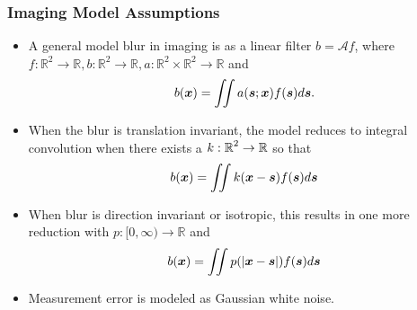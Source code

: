 \documentclass[]{beamer}
\newcommand{\R}{\ensuremath{\mathbb R}}  %
\newcommand{\bm}[1]{\mbox{\boldmath$#1$}}
\newcommand{\vect}[1]{\bm{#1}}
\begin{document}
\begin{frame}[t]
  \frametitle{Imaging Model Assumptions}
  \begin{itemize}
  \itemsep 1.2em
    \item A general model blur in imaging is as a \alert{linear filter} $b = \mathcal Af$, where $f:\R^2 \to \R,b:\R^2\to \R,a:\R^2\times\R^2 \to \R$ and $$ b(\vect x) = \iint a(\vect s;\vect x) f(\vect s)d\vect s. $$
    \item When the blur is \alert{translation invariant}, the model reduces to integral convolution when there exists a $k:\vect \R^2 \to \R$ so that $$b(\vect x) = \iint k(\vect x - \vect s) f(\vect s)d\vect s$$
    \item When blur is \alert{direction invariant} or \alert{isotropic}, this results in one more reduction with $p:[0,\infty) \to \R$ and $$b(\vect x) = \iint p(|\vect x - \vect s|) f(\vect s)d\vect s $$
    \item Measurement error is modeled as \alert{Gaussian} white noise.
  \end{itemize}
\end{frame}
\end{document}
